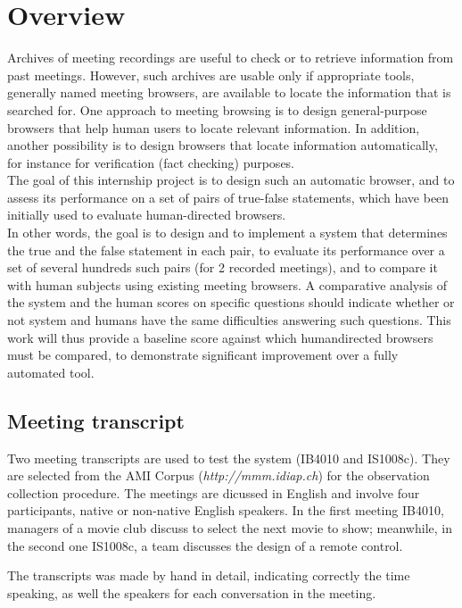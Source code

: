 \documentclass[12pt, a4paper]{report}
\begin{document}
\section{Overview}
Archives of meeting recordings are useful to check or to retrieve information from past
meetings. However, such archives are usable only if appropriate tools, generally named
meeting browsers, are available to locate the information that is searched for. One
approach to meeting browsing is to design general-purpose browsers that help human
users to locate relevant information. In addition, another possibility is to design browsers that
locate information automatically, for instance for verification (fact checking) purposes.\\

The goal of this internship project is to design such an automatic browser, and to assess
its performance on a set of pairs of true-false statements, which have been initially used
to evaluate human-directed browsers.\\

In other words, the goal is to design and to implement a system that determines the true
and the false statement in each pair, to evaluate its performance over a set of several
hundreds such pairs (for 2 recorded meetings), and to compare it with human subjects
using existing meeting browsers. A comparative analysis of the system and the human
scores on specific questions should indicate whether or not system and humans have the
same difficulties answering such questions. This work will thus provide a baseline score
against which humandirected browsers must be compared, to demonstrate significant
improvement over a fully automated tool.\\

\subsection{Meeting transcript}
Two meeting transcripts are used to test the system (IB4010 and IS1008c). They are selected from the AMI Corpus (\emph{http://mmm.idiap.ch}) for the observation collection procedure. The meetings are dicussed in English and involve four participants, native or non-native English speakers. In the first meeting IB4010, managers of a movie club discuss to select the next movie to show; meanwhile, in the second one IS1008c, a team discusses the design of a remote control. \cite{4}

The transcripts was made by hand in detail, indicating correctly the time speaking, as well the speakers for each conversation in the meeting.
\end{document}
